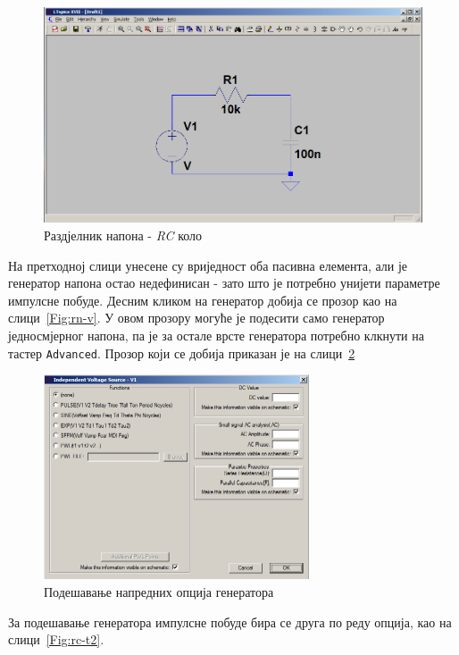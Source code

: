 \begin{figure}[h]
\centering
\includegraphics[width=\figwidth\textwidth]{figs/rc-t0.PNG}
\caption{Раздјелник напона - \textit{RC} коло}
\label{Fig:rc-t0}
\end{figure}

На претходној слици унесене су вриједност оба пасивна елемента, али је генератор напона остао недефинисан - зато што је потребно унијети параметре импулсне побуде. Десним кликом на генератор добија се прозор као на слици~\ref{Fig:rn-v}. У овом прозору могуће је подесити само генератор једносмјерног напона, па је за остале врсте генератора потребно клкнути на тастер \texttt{Advanced}. Прозор који се добија приказан је на слици~\ref{Fig:rc-t1}

\begin{figure}[h]
\centering
\includegraphics[width=0.7\textwidth]{figs/rc-t1.PNG}
\caption{Подешавање напредних опција генератора}
\label{Fig:rc-t1}
\end{figure}

За подешавање генератора импулсне побуде бира се друга по реду опција, као на слици~\ref{Fig:rc-t2}.

